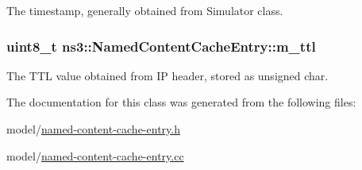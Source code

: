 The timestamp, generally obtained from Simulator class. 

\hypertarget{classns3_1_1NamedContentCacheEntry_a32091010cd1ac42594343b6e70a9ed4b}{
\subsubsection[{m\-\_\-ttl}]{\setlength{\rightskip}{0pt plus 5cm}uint8\-\_\-t ns3\-::\-Named\-Content\-Cache\-Entry\-::m\-\_\-ttl\hspace{0.3cm}{\ttfamily [private]}}}\label{classns3_1_1NamedContentCacheEntry_a32091010cd1ac42594343b6e70a9ed4b}


The T\-T\-L value obtained from I\-P header, stored as unsigned char. 



The documentation for this class was generated from the following files\-:\begin{DoxyCompactItemize}
\item 
model/\hyperlink{named-content-cache-entry_8h}{named-\/content-\/cache-\/entry.\-h}\item 
model/\hyperlink{named-content-cache-entry_8cc}{named-\/content-\/cache-\/entry.\-cc}\end{DoxyCompactItemize}
